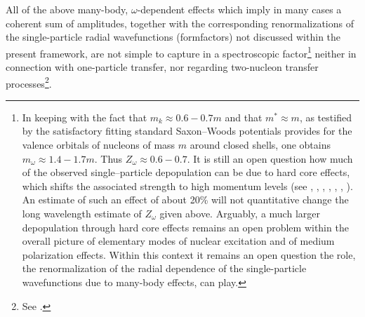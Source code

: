 All of the above many-body, $\omega$-dependent effects which imply in many cases a coherent sum of amplitudes, together with the corresponding renormalizations of the single-particle radial wavefunctions (formfactors) not discussed within the present framework, are not simple to capture in a spectroscopic factor\footnote{In keeping with the fact that $m_k\approx 0.6-0.7 m$ and that $m^*\approx m$, as testified by the satisfactory fitting standard Saxon--Woods potentials provides for the valence orbitals of nucleons of mass $m$ around closed shells, one obtains $m_\omega\approx 1.4-1.7 m$. Thus $Z_\omega \approx 0.6-0.7$. It is still an open question how much of the observed single--particle depopulation can be due to hard core effects, which shifts the associated strength to high momentum levels (see \cite{Dickhoff:05}, \cite{Jenning:11}, \cite{Kramer:01}, \cite{Barbieri:09}, \cite{Schiffer:12}, \cite{Duguet:12}, \cite{Furnstahl:10}).  An estimate of such an effect of about 20\% will not quantitative change the long wavelength estimate of $Z_\omega$ given above. Arguably, a much larger depopulation through hard core effects remains an open problem within the overall picture of elementary modes of nuclear excitation and of medium polarization effects. Within this context it remains an open question  the role,  the renormalization of the radial dependence of the single-particle wavefunctions due to many-body effects, can play.} neither in connection with one-particle transfer, nor regarding two-nucleon transfer processes\footnote{See \cite{Barranco:05,Barranco:99}.}. 






